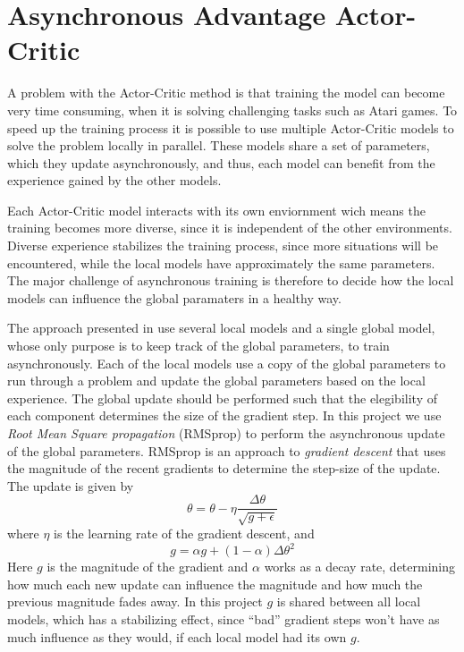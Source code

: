 \documentclass[11pt]{article}
\begin{document}

\section{Asynchronous Advantage Actor-Critic}

A problem with the Actor-Critic method is that training the model can become very time consuming,
when it is solving challenging tasks such as Atari games.
To speed up the training process it is possible to use 
multiple Actor-Critic models to 
solve the problem locally in parallel.
These models share a set of parameters, which they update asynchronously,
and thus, each model can benefit from the experience gained by the other models.

Each Actor-Critic model interacts with its own enviornment
wich means the training becomes more diverse, since it is independent of the other
environments.
Diverse experience stabilizes the training process,
since more situations will be encountered,
while the local models have approximately the same parameters.
The major challenge of asynchronous training is therefore to decide how
the local models can influence the global paramaters in a healthy
way.

The approach presented in \cite{a3c} use several local models
and a single global model, whose only purpose is to keep track of the global parameters,
to train asynchronously.
Each of the local models use a copy of the global parameters to run through a problem
and update the global parameters based on the local experience.
The global update should be performed such that
the elegibility of each component determines the size of the
gradient step.
In this project we use \textit{Root Mean Square propagation} (RMSprop)
to perform the asynchronous update of the global parameters.
RMSprop is an approach to \textit{gradient descent} 
that uses the magnitude of the recent gradients to
determine the step-size of the update.
The update is given by 
\begin{equation}
    \theta = \theta - \eta \frac{\Delta \theta}{\sqrt{g + \epsilon}}
\end{equation}
where $\eta$ is the learning rate of the gradient descent, and 
\begin{equation}
    g = \alpha g + (1 - \alpha) \Delta \theta^2
\end{equation}
Here $g$ is the magnitude of the gradient and $\alpha$ works as a decay rate, determining how much each new update
can influence the magnitude and how much the previous magnitude fades away.
In this project $g$ is shared between all local models, which has a stabilizing
effect, since “bad” gradient steps won't have as much influence as they would,
if each local model had its own $g$.
\end{document}
